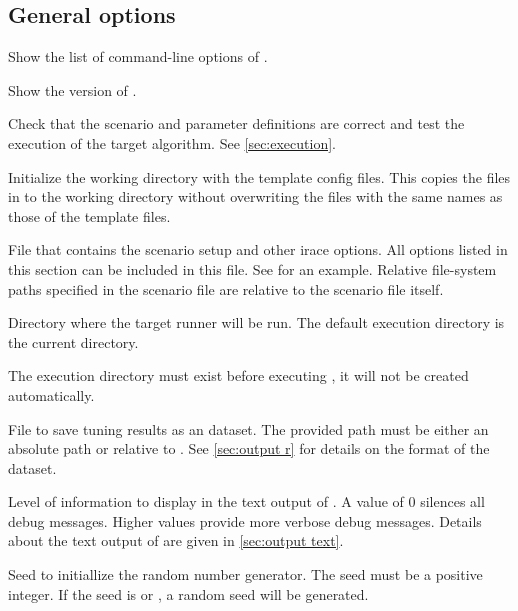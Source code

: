


\subsection[General options]{General options}
\begin{description}
Show the list of command-line options of \irace.

Show the version of \irace.

Check that the scenario and parameter definitions are correct and test the execution of the target algorithm. See \autoref{sec:execution}.

Initialize the working directory with the template config files. This copies the files in  to the working directory without overwriting the files with the same names as those of the template files.

File that contains the scenario setup and other irace options. All options listed in this section can be included in this file. See  for an example. Relative file-system paths specified in the scenario file are relative to the scenario file itself.

Directory where the target runner will be run. The default execution directory is the current directory.
 \begin{xwarningbox}
 The execution directory must exist before executing \irace, it will not be created automatically.
\end{xwarningbox}

  File to save tuning results as an \aR dataset. The provided path must be either an absolute path or relative to . See \autoref{sec:output r} for details on the format of the \aR dataset.

Level of information to display in the text output of \irace. A value of 0 silences all debug messages. Higher values provide more verbose debug messages. Details about the text output of \irace are given in \autoref{sec:output text}.

Seed to initiallize the random number generator. The seed must be a positive integer. If the seed is  or , a random seed will be generated.


\end{description}
